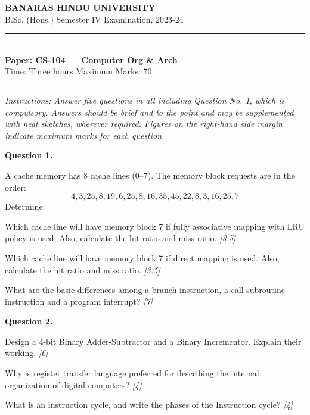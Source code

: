 \documentclass[11pt,a4paper]{article}
\newcommand{\pts}[1]{\hfill   \textit{[#1]}}
\begin{document}
\begin{center}
  {\large\bfseries BANARAS HINDU UNIVERSITY}\\[2pt]
  {
\normalsize B.Sc. (Hons.) Semester IV Examination, 2023-24}\\[6pt]
  \rule{0.8\linewidth}{0.5pt}\\[6pt]
  {\large\bfseries Paper: CS-104 --- Computer Org \& Arch}\\[4pt]
  {
\normalsize Time: Three hours \hfill Maximum Marks: 70}
\end{center}

\rule{\linewidth}{0.4pt}

\smallskip



\noindent   \textit{Instructions: Answer five questions in all including Question No. 1, which is compulsory. Answers should be brief and to the point and may be supplemented with neat sketches, wherever required. Figures on the right-hand side margin indicate maximum marks for each question.}

\bigskip

\medskip


\noindent   \textbf{Question 1.}

\begin{parts}
  \item A cache memory has 8 cache lines (0--7). The memory block requests are in the order:
  \[ 4, 3, 25, 8, 19, 6, 25, 8, 16, 35, 45, 22, 8, 3, 16, 25, 7 \]
  Determine:
  
\begin{parts}
    \item Which cache line will have memory block 7 if fully associative mapping with LRU policy is used. Also, calculate the hit ratio and miss ratio. \pts{3.5}
    \item Which cache line will have memory block 7 if direct mapping is used. Also, calculate the hit ratio and miss ratio. \pts{3.5}
  \end{parts}
  \item What are the basic differences among a branch instruction, a call subroutine instruction and a program interrupt? \pts{7}
\end{parts}

\medskip


\noindent   \textbf{Question 2.}

\begin{parts}
  \item Design a 4-bit Binary Adder-Subtractor and a Binary Incrementor. Explain their working. \pts{6}
  \item Why is register transfer language preferred for describing the internal organization of digital computers? \pts{4}
  \item What is an instruction cycle, and write the phases of the Instruction cycle? \pts{4}
\end{parts}
\end{document}
